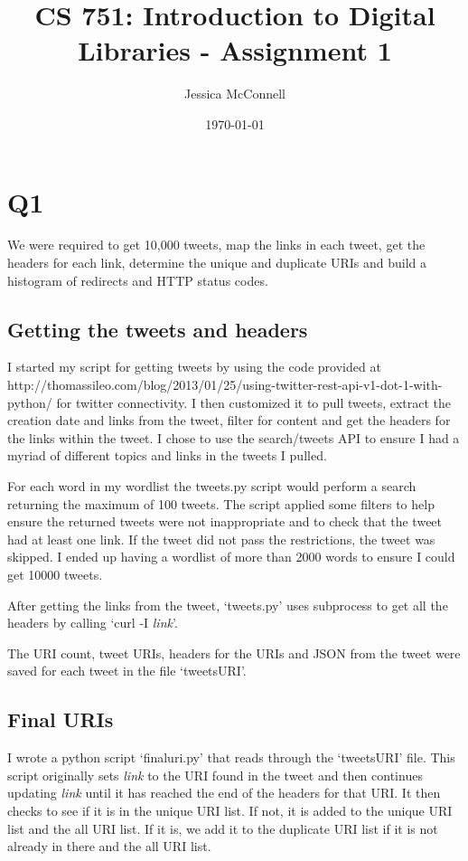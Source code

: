 \documentclass[12pt]{article}
\title{CS 751: Introduction to Digital Libraries - Assignment 1}
\author{Jessica McConnell}
\date{\today}
\begin{document}
\maketitle

\section{Q1}

We were required to get 10,000 tweets, map the links in each tweet, get the headers for each link, determine the unique and duplicate URIs and build a histogram of redirects and HTTP status codes.

\subsection{Getting the tweets and headers}

I started my script for getting tweets by using the code provided at http://thomassileo.com/blog/2013/01/25/using-twitter-rest-api-v1-dot-1-with-python/ for twitter connectivity.  I then customized it to pull tweets, extract the creation date and links from the tweet, filter for content and get the headers for the links within the tweet.  I chose to use the search/tweets API to ensure I had a myriad of different topics and links in the tweets I pulled.

For each word in my wordlist the tweets.py script would perform a search returning the maximum of 100 tweets.  The script applied some filters to help ensure the returned tweets were not inappropriate and to check that the tweet had at least one link.  If the tweet did not pass the restrictions, the tweet was skipped.  I ended up having a wordlist of more than 2000 words to ensure I could get 10000 tweets.

After getting the links from the tweet, `tweets.py' uses subprocess to get all the headers by calling `curl -I \textit{link}'.

The URI count, tweet URIs, headers for the URIs and JSON from the tweet were saved for each tweet in the file `tweetsURI'.

\subsection{Final URIs}

I wrote a python script `finaluri.py' that reads through the `tweetsURI' file.  This script originally sets \textit{link} to the URI found in the tweet and then continues updating \textit{link} until it has reached the end of the headers for that URI.  It then checks to see if it is in the unique URI list.  If not, it is added to the unique URI list and the all URI list.  If it is, we add it to the duplicate URI list if it is not already in there and the all URI list.
\end{document}

